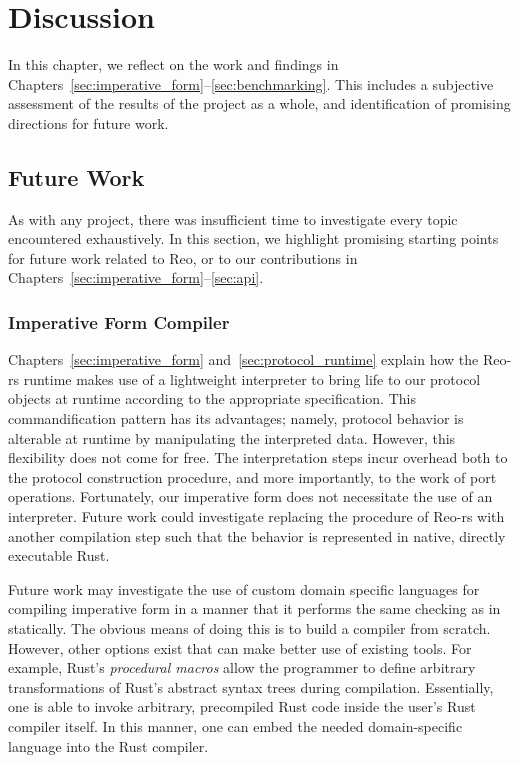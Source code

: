 \chapter{Discussion}
In this chapter, we reflect on the work and findings in Chapters~\ref{sec:imperative_form}--\ref{sec:benchmarking}. This includes a subjective assessment of the results of the project as a whole, and identification of promising directions for future work.

\label{sec:discussion}
\section{Future Work}
As with any project, there was insufficient time to investigate every topic encountered exhaustively. In this section, we highlight promising starting points for future work related to Reo, or to our contributions in Chapters~\ref{sec:imperative_form}--\ref{sec:api}.

\subsection{Imperative Form Compiler}
\label{sec:future_imperative_compiler}
Chapters~\ref{sec:imperative_form} and~\ref{sec:protocol_runtime} explain how the Reo-rs runtime makes use of a lightweight interpreter to bring life to our protocol objects at runtime according to the appropriate specification. This commandification pattern has its advantages; namely, protocol behavior is alterable at runtime by manipulating the interpreted data. However, this flexibility does not come for free. The interpretation steps incur overhead both to the protocol construction procedure, and more importantly, to the work of port operations. Fortunately, our imperative form does not necessitate the use of an interpreter. Future work could investigate replacing the  procedure of Reo-rs with another compilation step such that the behavior is represented in native, directly executable Rust. 

Future work may investigate the use of custom domain specific languages for compiling imperative form in a manner that it performs the same checking as in  statically. The obvious means of doing this is to build a compiler from scratch. However, other options exist that can make better use of existing tools. For example, Rust's \textit{procedural macros} allow the programmer to define arbitrary transformations of Rust's abstract syntax trees during compilation. Essentially, one is able to invoke arbitrary, precompiled Rust code inside the user's Rust compiler itself. In this manner, one can embed the needed domain-specific language into the Rust compiler.

